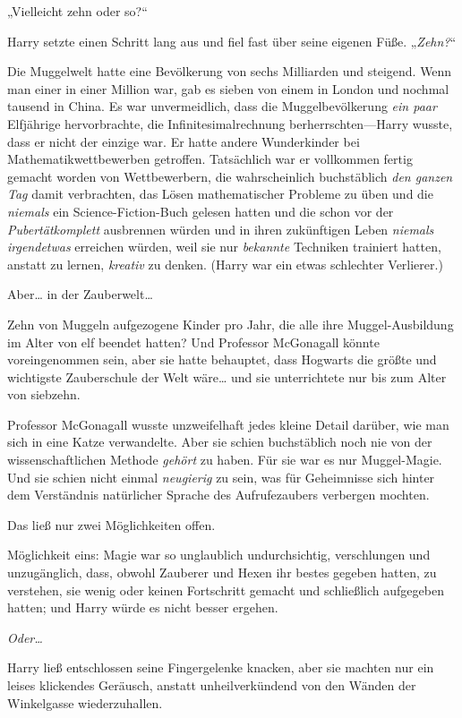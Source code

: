 {„Vielleicht zehn oder so?“

Harry setzte einen Schritt lang aus und fiel fast über seine eigenen Füße. „\emph{Zehn?}“

Die Muggelwelt hatte eine Bevölkerung von sechs Milliarden und steigend. Wenn man einer in einer Million war, gab es sieben von einem in London und nochmal tausend in China. Es war unvermeidlich, dass die Muggelbevölkerung \emph{ein paar} Elfjährige hervorbrachte, die Infinitesimalrechnung berherrschten—Harry wusste, dass er nicht der einzige war. Er hatte andere Wunderkinder bei Mathematikwettbewerben getroffen. Tatsächlich war er vollkommen fertig gemacht worden von Wettbewerbern, die wahrscheinlich buchstäblich \emph{den ganzen Tag} damit verbrachten, das Lösen mathematischer Probleme zu üben und die \emph{niemals} ein Science-Fiction-Buch gelesen hatten und die schon vor der \emph{Pubertätkomplett} ausbrennen würden und in ihren zukünftigen Leben \emph{niemals irgendetwas} erreichen würden, weil sie nur \emph{bekannte} Techniken trainiert hatten, anstatt zu lernen, \emph{kreativ} zu denken. (Harry war ein etwas schlechter Verlierer.)

Aber… in der Zauberwelt…

Zehn von Muggeln aufgezogene Kinder pro Jahr, die alle ihre Muggel-Ausbildung im Alter von elf beendet hatten? Und Professor McGonagall könnte voreingenommen sein, aber sie hatte behauptet, dass Hogwarts die größte und wichtigste Zauberschule der Welt wäre… und sie unterrichtete nur bis zum Alter von siebzehn.

Professor McGonagall wusste unzweifelhaft jedes kleine Detail darüber, wie man sich in eine Katze verwandelte. Aber sie schien buchstäblich noch nie von der wissenschaftlichen Methode \emph{gehört} zu haben. Für sie war es nur Muggel-Magie. Und sie schien nicht einmal \emph{neugierig} zu sein, was für Geheimnisse sich hinter dem Verständnis natürlicher Sprache des Aufrufezaubers verbergen mochten.

Das ließ nur zwei Möglichkeiten offen.

Möglichkeit eins: Magie war so unglaublich undurchsichtig, verschlungen und unzugänglich, dass, obwohl Zauberer und Hexen ihr bestes gegeben hatten, zu verstehen, sie wenig oder keinen Fortschritt gemacht und schließlich aufgegeben hatten; und Harry würde es nicht besser ergehen.

\emph{Oder…}

Harry ließ entschlossen seine Fingergelenke knacken, aber sie machten nur ein leises klickendes Geräusch, anstatt unheilverkündend von den Wänden der Winkelgasse wiederzuhallen.

}
